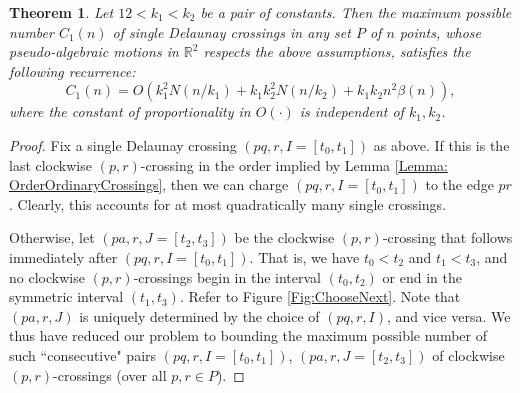 \documentclass[letter,11pt]{article}
\newtheorem{theorem}{Theorem}[section]
\def \reals{{\mathbb R}}
\begin{document}
\begin{theorem}\label{Thm:OrdinaryCrossings}
Let $12<k_1<k_2$ be a pair of constants. Then the maximum possible number $C_1(n)$ of single Delaunay crossings in any set $P$ of $n$ points, whose pseudo-algebraic motions in $\reals^2$ respects the above assumptions, satisfies the following recurrence:
\begin{equation}\label{Eq:OrdinaryCrossing}
C_1(n)=O\left(k_1^2 N(n/k_1)+k_1 k_2^2 N(n/k_2)+k_1k_2n^2\beta(n)\right),
\end{equation}
where the constant of proportionality in $O(\cdot)$ is independent of $k_1,k_2$.
\end{theorem}
\begin{proof}Fix a single Delaunay crossing $(pq,r,I=[t_0,t_1])$ as above. If this is the last clockwise $(p,r)$-crossing in the order implied by Lemma \ref{Lemma: OrderOrdinaryCrossings}, then we can charge $(pq,r,I=[t_0,t_1])$ to the edge $pr$. Clearly, this accounts for at most quadratically many single crossings. 

Otherwise, let $(pa,r,J=[t_2,t_3])$ be the clockwise $(p,r)$-crossing that follows immediately after $(pq,r,I=[t_0,t_1])$. That is, we have $t_0<t_2$ and $t_1<t_3$, and no clockwise $(p,r)$-crossings begin in the interval $(t_0,t_2)$ or end in the symmetric interval $(t_1,t_3)$. Refer to Figure \ref{Fig:ChooseNext}.
Note that $(pa,r,J)$ is uniquely determined by the choice of $(pq,r,I)$, and vice versa.
We thus have reduced our problem to bounding the maximum possible number of such ``consecutive" pairs $(pq,r,I=[t_0,t_1])$,  $(pa,r,J=[t_2,t_3])$ of clockwise $(p,r)$-crossings (over all $p,r\in P$). 











\end{proof}
\end{document}
